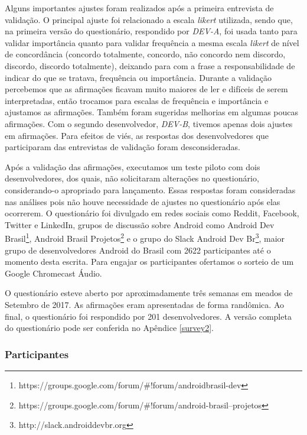 Alguns importantes ajustes foram realizados após a primeira entrevista de validação. O principal ajuste foi relacionado a escala \textit{likert} utilizada, sendo que, na primeira versão do questionário, respondido por \emph{DEV-A}, foi usada tanto para validar importância quanto para validar frequência a mesma escala \textit{likert} de nível de concordância (concordo totalmente, concordo, não concordo nem discordo, discordo, discordo totalmente), deixando para com a frase a responsabilidade de indicar do que se tratava, frequência ou importância. Durante a validação percebemos que as afirmações ficavam muito maiores de ler e difíceis de serem interpretadas, então trocamos para escalas de frequência e importância e ajustamos as afirmações. Também foram sugeridas melhorias em algumas poucas afirmações. Com o segundo desenvolvedor, \emph{DEV-B}, tivemos apenas dois ajustes em afirmações. Para efeitos de viés, as respostas dos desenvolvedores que participaram das entrevistas de validação foram desconsideradas.

Após a validação das afirmações, executamos um teste piloto com dois desenvolvedores, dos quais, não solicitaram alterações no questionário, considerando-o apropriado para lançamento. Essas respostas foram consideradas nas análises pois não houve necessidade de ajustes no questionário após elas ocorrerem. O questionário foi divulgado em redes sociais como Reddit, Facebook, Twitter e LinkedIn, grupos de discussão sobre Android como Android Dev Brasil\footnote{https://groups.google.com/forum/\#!forum/androidbrasil-dev}, Android Brasil Projetos\footnote{https://groups.google.com/forum/\#!forum/android-brasil--projetos} e o grupo do Slack Android Dev Br\footnote{http://slack.androiddevbr.org}, maior grupo de desenvolvedores Android do Brasil com 2622 participantes até o momento desta escrita. Para engajar os participantes ofertamos o sorteio de um Google Chromecast Áudio. 

O questionário esteve aberto por aproximadamente três semanas em meados de Setembro de 2017. As afirmações eram apresentadas de forma randômica. Ao final, o questionário foi respondido por 201 desenvolvedores. A versão completa do questionário pode ser conferida no Apêndice \ref{survey2}. 

\subsubsection{Participantes}
\label{etapa-2-participantes}

